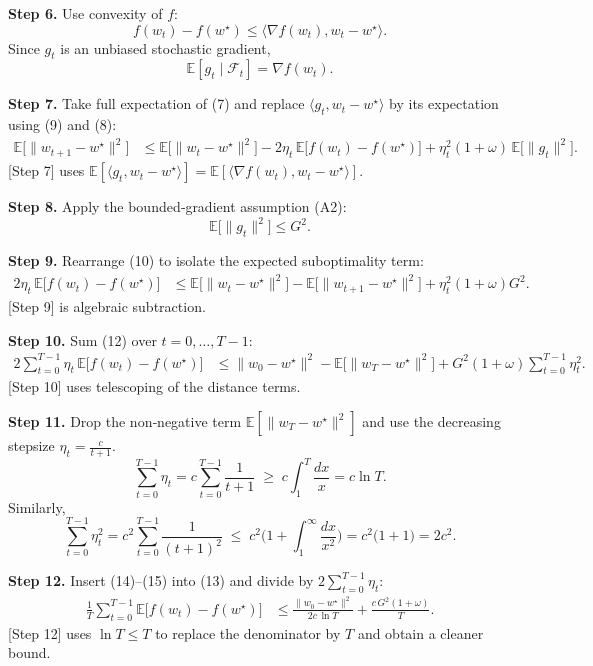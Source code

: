 \documentclass{article}
\begin{document}
\noindent\textbf{Step 6.} Use convexity of $f$:
\[
f(w_t)-f(w^\star)\le\langle\nabla f(w_t),w_t-w^\star\rangle .
\tag{8}
\]
Since $g_t$ is an unbiased stochastic gradient,
\[
\mathbb{E}[g_t\mid\mathcal{F}_t]=\nabla f(w_t) .
\tag{9}
\]

\noindent\textbf{Step 7.} Take full expectation of (7) and replace $\langle g_t,w_t-w^\star\rangle$ by its expectation using (9) and (8):
\begin{align}
\mathbb{E}\!\big[\|w_{t+1}-w^\star\|^2\big]
&\le \mathbb{E}\!\big[\|w_t-w^\star\|^2\big]
   -2\eta_t\,\mathbb{E}\!\big[f(w_t)-f(w^\star)\big]
   +\eta_t^2(1+\omega)\,\mathbb{E}\!\big[\|g_t\|^2\big] .
\tag{10}
\end{align}
[Step 7] uses $\mathbb{E}[\langle g_t,w_t-w^\star\rangle]=\mathbb{E}[\langle\nabla f(w_t),w_t-w^\star\rangle]$.

\noindent\textbf{Step 8.} Apply the bounded‑gradient assumption (A2):
\[
\mathbb{E}\!\big[\|g_t\|^2\big]\le G^2 .
\tag{11}
\]

\noindent\textbf{Step 9.} Rearrange (10) to isolate the expected suboptimality term:
\begin{align}
2\eta_t\,\mathbb{E}\!\big[f(w_t)-f(w^\star)\big]
&\le \mathbb{E}\!\big[\|w_t-w^\star\|^2\big]-\mathbb{E}\!\big[\|w_{t+1}-w^\star\|^2\big]
   +\eta_t^2(1+\omega)G^2 .
\tag{12}
\end{align}
[Step 9] is algebraic subtraction.

\noindent\textbf{Step 10.} Sum (12) over $t=0,\dots,T-1$:
\begin{align}
2\sum_{t=0}^{T-1}\eta_t\,\mathbb{E}\!\big[f(w_t)-f(w^\star)\big]
&\le \|w_0-w^\star\|^2-\mathbb{E}\!\big[\|w_T-w^\star\|^2\big]
   +G^2(1+\omega)\sum_{t=0}^{T-1}\eta_t^2 .
\tag{13}
\end{align}
[Step 10] uses telescoping of the distance terms.

\noindent\textbf{Step 11.} Drop the non‑negative term $\mathbb{E}[\|w_T-w^\star\|^2]$ and use the decreasing stepsize $\eta_t=\frac{c}{t+1}$.
\[
\sum_{t=0}^{T-1}\eta_t = c\sum_{t=0}^{T-1}\frac{1}{t+1}
\;\ge\; c\int_{1}^{T}\frac{dx}{x}=c\ln T .
\tag{14}
\]
Similarly,
\[
\sum_{t=0}^{T-1}\eta_t^2 = c^2\sum_{t=0}^{T-1}\frac{1}{(t+1)^2}
\;\le\; c^2\Big(1+\int_{1}^{\infty}\frac{dx}{x^2}\Big)=c^2\Big(1+1\Big)=2c^2 .
\tag{15}
\]

\noindent\textbf{Step 12.} Insert (14)–(15) into (13) and divide by $2\sum_{t=0}^{T-1}\eta_t$:
\begin{align}
\frac{1}{T}\sum_{t=0}^{T-1}\mathbb{E}\!\big[f(w_t)-f(w^\star)\big]
&\le
\frac{\|w_0-w^\star\|^2}{2c\,\ln T}
   +\frac{c\,G^2(1+\omega)}{T} .
\tag{16}
\end{align}
[Step 12] uses $\ln T\le T$ to replace the denominator by $T$ and obtain a cleaner bound.
\end{document}
